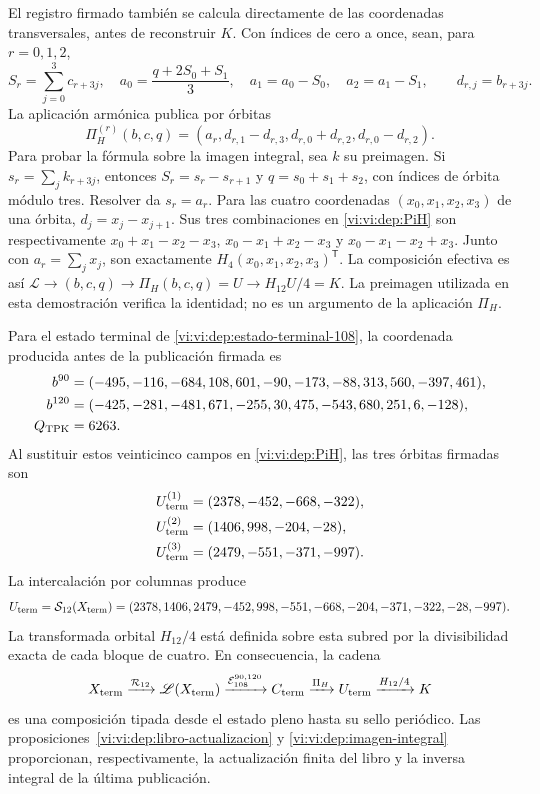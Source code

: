 El registro firmado también se calcula directamente de las coordenadas
transversales, antes de reconstruir \(K\). Con índices de cero a once,
sean, para \(r=0,1,2\),
\[
 S_r=\sum_{j=0}^3c_{r+3j},\quad
 a_0=\frac{q+2S_0+S_1}{3},\quad
 a_1=a_0-S_0,\quad a_2=a_1-S_1,
 \qquad d_{r,j}=b_{r+3j}.
\]
La aplicación armónica publica por órbitas
\begin{equation}
 \Pi_H^{(r)}(b,c,q)=
 (a_r,d_{r,1}-d_{r,3},d_{r,0}+d_{r,2},d_{r,0}-d_{r,2}).
 \label{vi:vi:dep:PiH}
\end{equation}
Para probar la fórmula sobre la imagen integral, sea \(k\) su
preimagen. Si \(s_r=\sum_jk_{r+3j}\), entonces
\(S_r=s_r-s_{r+1}\) y \(q=s_0+s_1+s_2\), con índices de órbita
módulo tres. Resolver da \(s_r=a_r\). Para las cuatro coordenadas
\((x_0,x_1,x_2,x_3)\) de una órbita,
\(d_j=x_j-x_{j+1}\). Sus tres combinaciones en
\eqref{vi:vi:dep:PiH} son respectivamente
\(x_0+x_1-x_2-x_3\), \(x_0-x_1+x_2-x_3\) y
\(x_0-x_1-x_2+x_3\). Junto con \(a_r=\sum_jx_j\), son
exactamente \(H_4(x_0,x_1,x_2,x_3)^{\mathsf T}\).
La composición efectiva es así
\(\mathscr L\to(b,c,q)\to\Pi_H(b,c,q)=U\to H_{12}U/4=K\).
La preimagen utilizada en esta demostración verifica la identidad;
no es un argumento de la aplicación \(\Pi_H\).

Para el estado terminal de \eqref{vi:vi:dep:estado-terminal-108}, la coordenada
producida antes de la publicación firmada es
\begin{align}
 b^{90}={}&(-495,-116,-684,108,601,-90,
              -173,-88,313,560,-397,461),\notag\\
 b^{120}={}&(-425,-281,-481,671,-255,30,
               475,-543,680,251,6,-128),\notag\\
 Q_{\rm TPK}={}&6263.
 \label{vi:vi:dep:canales-terminales}
\end{align}
Al sustituir estos veinticinco campos en \eqref{vi:vi:dep:PiH}, las tres
órbitas firmadas son
\begin{align*}
 U_{\rm term}^{(1)}&=(2378,-452,-668,-322),\\
 U_{\rm term}^{(2)}&=(1406,998,-204,-28),\\
 U_{\rm term}^{(3)}&=(2479,-551,-371,-997).
\end{align*}
La intercalación por columnas produce
\begin{equation}
 U_{\rm term}=\mathcal S_{12}(X_{\rm term})
 =(2378,1406,2479,-452,998,-551,-668,-204,-371,-322,-28,-997).
 \label{vi:vi:dep:U-terminal}
\end{equation}
La transformada orbital \(H_{12}/4\) está definida sobre esta subred por
la divisibilidad exacta de cada bloque de cuatro. En consecuencia, la cadena
\begin{equation}
 X_{\rm term}\xrightarrow{\mathcal R_{12}}\mathscr L(X_{\rm term})
 \xrightarrow{\mathcal E_{108}^{90,120}}C_{\rm term}
 \xrightarrow{\Pi_H}U_{\rm term}
 \xrightarrow{H_{12}/4}K
 \label{vi:vi:dep:cadena-terminal-completa}
\end{equation}
es una composición tipada desde el estado pleno hasta su sello periódico.
Las proposiciones~\ref{vi:vi:dep:libro-actualizacion} y
\ref{vi:vi:dep:imagen-integral} proporcionan, respectivamente, la actualización
finita del libro y la inversa integral de la última publicación.

